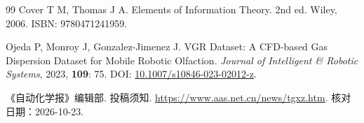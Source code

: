 \begin{thebibliography}{99}
Cover T M, Thomas J A. Elements of Information Theory. 2nd ed. Wiley, 2006. ISBN: 9780471241959.

Ojeda P, Monroy J, Gonzalez-Jimenez J. {VGR Dataset}: A {CFD}-based Gas Dispersion Dataset for Mobile Robotic Olfaction. {\sl Journal of Intelligent \& Robotic Systems}, 2023, {\bf 109}: 75. DOI: \url{10.1007/s10846-023-02012-z}.

《自动化学报》编辑部. 投稿须知. \url{https://www.aas.net.cn/news/tgxz.htm}. 核对日期：2026-10-23.

\end{thebibliography}
